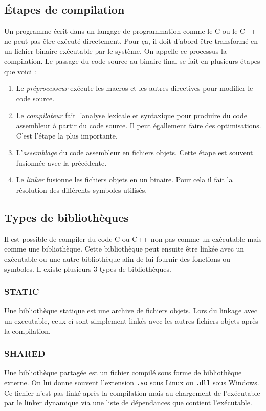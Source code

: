 \documentclass[a4paper]{report}
\begin{document}
\subsection{Étapes de compilation}
Un programme écrit dans un langage de programmation comme le C ou le C++ ne peut pas être exécuté directement.
Pour ça, il doit d'abord être transformé en un fichier binaire exécutable par le système.
On appelle ce processus la compilation.
Le passage du code source au binaire final se fait en plusieurs étapes que voici :
\begin{enumerate}
    \item Le \emph{préprocesseur} exécute les macros et les autres directives pour modifier le code source.
    \item Le \emph{compilateur} fait l'analyse lexicale et syntaxique pour produire du code assembleur à partir du code source.
          Il peut égallement faire des optimisations.
          C'est l'étape la plus importante.
    \item L'\emph{assemblage} du code assembleur en fichiers objets.
          Cette étape est souvent fusionnée avec la précédente.
    \item Le \emph{linker} fusionne les fichiers objets en un binaire.
          Pour cela il fait la résolution des différents symboles utilisés.
\end{enumerate}

\subsection{Types de bibliothèques}
Il est possible de compiler du code C ou C++ non pas comme un exécutable mais comme une bibliothèque.
Cette bibliothèque peut ensuite être linkée avec un exécutable ou une autre bibliothèque afin de lui fournir des fonctions ou symboles.
Il existe plusieurs 3 types de bibliothèques.

\subsubsection{STATIC}
Une bibliothèque statique est une archive de fichiers objets.
Lors du linkage avec un executable, ceux-ci sont simplement linkés avec les autres fichiers objets après la compilation.

\subsubsection{SHARED}
Une bibliothèque partagée est un fichier compilé sous forme de bibliothèque externe.
On lui donne souvent l'extension \verb'.so' sous Linux ou \verb'.dll' sous Windows.
Ce fichier n'est pas linké après la compilation mais au chargement de l'exécutable par le linker dynamique via une liste de dépendances que contient l'exécutable.
\end{document}

